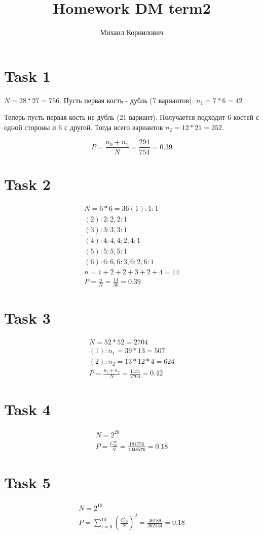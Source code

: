 \documentclass{article}
\title{Homework DM term2}
\author{Михаил Корнилович}
\begin{document}
    \maketitle
    \newpage
	
	\section{Task 1}
	$N = 28 * 27 = 756$. Пусть первая кость - дубль (7 вариантов). $n_1 = 7 * 6 = 42$
	
	\noindent Теперь пусть первая кость не дубль (21 вариант). Получается подходит 6 костей с одной стороны и 6 с другой. Тогда всего вариантов $n_2 = 12 * 21 = 252$.
	
	$$
		P = \frac{n_0 + n_1}{N} = \frac{294}{754} = 0.39
	$$
	
	\section{Task 2}
	
	\begin{align*}
		N = 6 * 6 = 36
		(1): 1 : 1 \\
		(2): 2 : 2, 2 : 1 \\
		(3): 3 : 3, 3 : 1 \\
		(4): 4 : 4, 4 : 2, 4 : 1 \\
		(5): 5 : 5, 5 : 1 \\
		(6): 6 : 6, 6 : 3, 6 : 2, 6 : 1 \\
		n = 1 + 2 + 2 + 3 + 2 + 4 = 14 \\
		P = \frac{n}{N} = \frac{14}{36} = 0.39
	\end{align*}
	
	\section{Task 3}
	
	\begin{align*}
		N = 52 * 52 = 2704 \\
		(1): n_1 = 39 * 13 = 507 \\
		(2): n_2 = 13 * 12 * 4 = 624 \\
		P = \frac{n_1 + n_2}{N} = \frac{1131}{2704} = 0.42
	\end{align*}
	
	\section{Task 4}
	\begin{align*}
		N = 2^{20} \\
		P = \frac{C_{20}^{10}}{N} = \frac{184756}{1048576} = 0.18
	\end{align*}
	
	\section{Task 5}
	\begin{align*}
		N = 2^{10} \\
		P = \sum\limits_{i = 0}^{10}(\frac{C_{10}^{i}}{N})^2 = \frac{46189}{262144} = 0.18
	\end{align*}
\end{document}
